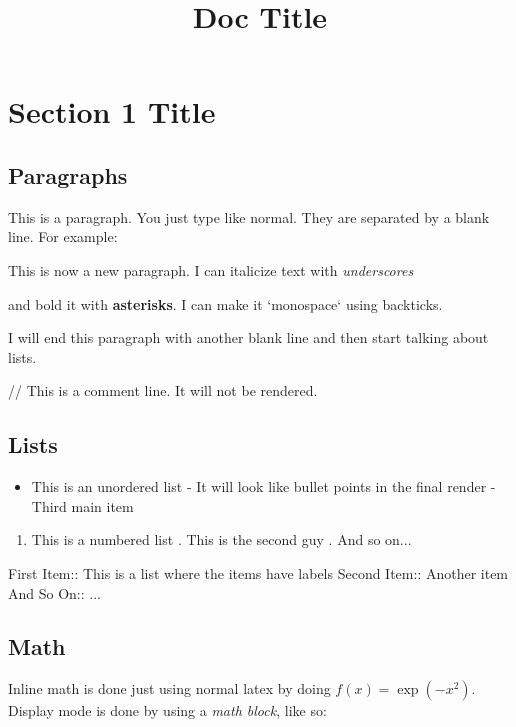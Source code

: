 \documentclass[12pt]{article}
\title{Doc Title}
\begin{document}
\maketitle
\tableofcontents

 \section{Section 1 Title}


 \subsection{Paragraphs}


This is a paragraph.  You just type like normal.  They are separated by a blank line.  For example:

This is now a new paragraph.  I can italicize text with \emph{underscores}

and bold it with \textbf{asterisks}.  I can make it `monospace` using backticks.

I will end this paragraph with another blank line and then start talking about lists.

// This is a comment line.  It will not be rendered.

 \subsection{Lists}


 \begin{itemize}
 \item This is an unordered list - It will look like bullet points in the final render - Third main item \end{itemize}


 \begin{enumerate}
 \item This is a numbered list . This is the second guy . And so on... \end{enumerate}


First Item:: This is a list where the items have labels Second Item:: Another item And So On:: ...

 \subsection{Math}


Inline math is done just using normal latex by doing $f(x) = \exp
(-x^2)$.  Display mode is done by using a \emph{math block}, like so:
\end{document}
